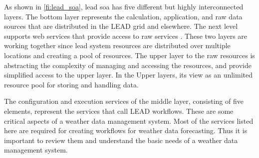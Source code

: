 As shown in \cref{fi:lead_soa}, \acrshort{lead} \acrshort{soa} has five different but highly interconnected layers. The bottom layer represents the calculation, application, and raw data sources that are distributed in the LEAD grid and elsewhere. The next level supports web services that provide access to raw services \cite{Droegemeier2005Service-OrientedWeather}. These two layers are working together since \acrshort{lead} system resources are distributed over multiple locations and creating a pool of resources. The upper layer to the raw resources is abstracting the complexity of managing and accessing the resources, and provide simplified access to the upper layer. In the Upper layers, its view as an unlimited resource pool for storing and handling data.

The configuration and execution services of the middle layer, consisting of five elements, represent the services that call LEAD workflows. These are some critical aspects of a weather data management system. Most of the services listed here are required for creating workflows for weather data forecasting. Thus it is important to review them and understand the basic needs of a weather data management system.

